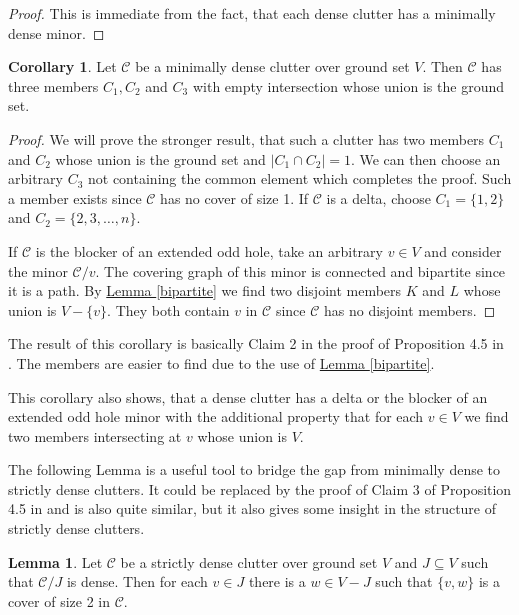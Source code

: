 \documentclass[a4paper, 12pt, twoside=false]{scrbook}
\theoremstyle{definition}
\newtheorem{corollary}[theorem]{Corollary}
\newtheorem{lemma}[theorem]{Lemma}
\begin{document}
   \begin{proof}
       This is immediate from the fact, that each dense clutter has a minimally dense minor.
   \end{proof}

   \begin{corollary}\label{threemember}
       Let $\mathcal{C}$ be a minimally dense clutter over ground set $V$.
       Then $\mathcal{C}$ has three members $C_1, C_2$ and $C_3$ with empty intersection whose union is the ground set.
   \end{corollary}

   \begin{proof}
       We will prove the stronger result, that such a clutter has two members $C_1$ and $C_2$ whose union is the ground set and $|C_1 \cap C_2|=1$.
       We can then choose an arbitrary $C_3$ not containing the common element which completes the proof.
       Such a member exists since $\mathcal{C}$ has no cover of size 1.
       If $\mathcal{C}$ is a delta, choose $C_1=\{1,2\}$ and $C_2=\{2,3,\ldots,n\}$.

       If $\mathcal{C}$ is the blocker of an extended odd hole, take an arbitrary $v \in V$ and consider the minor $\mathcal{C} / v$.
       The covering graph of this minor is connected and bipartite since it is a path.
       By \hyperref[bipartite]{Lemma \ref*{bipartite}} we find two disjoint members $K$ and $L$ whose union is $V-\{v\}$.
       They both contain $v$ in $\mathcal{C}$ since $\mathcal{C}$ has no disjoint members.
   \end{proof}

   The result of this corollary is basically Claim 2 in the proof of Proposition 4.5 in \cite{restrictions}. The members are easier to find due to the use of \hyperref[bipartite]{Lemma \ref*{bipartite}}.

   This corollary also shows, that a dense clutter has a delta or the blocker of an extended odd hole minor with the additional property that for each $v \in V$ we find two members intersecting at $v$ whose union is $V$.

   The following Lemma is a useful tool to bridge the gap from minimally dense to strictly dense clutters. It could be replaced by the proof of Claim 3 of Proposition 4.5 in \cite{restrictions} and is also quite similar, but it also gives some insight in the structure of strictly dense clutters.
   \begin{lemma}\label{covers}
       Let $\mathcal{C}$ be a strictly dense clutter over ground set $V$ and $J \subseteq V$ such that $\mathcal{C} / J$ is dense.
       Then for each $v \in J$ there is a $w \in V-J$ such that $\{v,w\}$ is a cover of size 2 in $\mathcal{C}$.
   \end{lemma}
\end{document}
